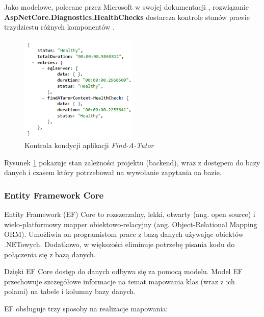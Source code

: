 \documentclass[12pt]{article}
\numberwithin{figure}{section}
\begin{document}
Jako modelowe, polecane przez Microsoft w swojej dokumentacji \cite{health-checks}, rozwiązanie \textbf{AspNetCore.Diagnostics.HealthChecks} dostarcza kontrole stanów prawie trzydziestu różnych komponentów \cite{health-checks-github}.
        
    \begin{figure}[H] 
     	\centering
    	\includegraphics[width=0.5\textwidth]{images/chapter_3/api-health-check.png}
    	\caption{Kontrola kondycji aplikacji \textit{Find-A-Tutor}}
    	\label{fig:health-check}
    \end{figure}
    
Rysunek \ref{fig:health-check} pokazuje stan zależności projektu (backend), wraz z dostępem do bazy danych i czasem który potrzebował na wywołanie zapytania na bazie.

\label{EF}
\subsubsection{Entity Framework Core}
Entity Framework (EF) Core to rozszerzalny, lekki, otwarty (ang. open source) i wielo-platformowy mapper obiektowo-relacyjny (ang. Object-Relational Mapping ORM). Umożliwia on programistom prace z bazą danych używając obiektów .NETowych. Dodatkowo, w większości eliminuje potrzebę pisania kodu do połączenia się z bazą danych. 
    
Dzięki EF Core dostęp do danych odbywa się za pomocą modelu. Model EF przechowuje szczegółowe informacje na temat mapowania klas (wraz z ich polami) na tabele i kolumny bazy danych.
    
EF obsługuje trzy sposoby na realizacje mapowania:
    
\end{document}
